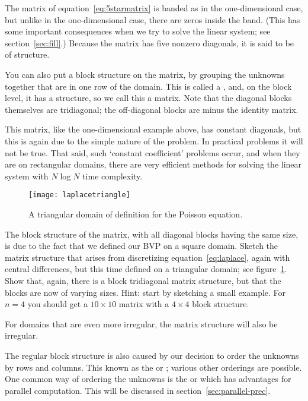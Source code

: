 The matrix of equation~\ref{eq:5starmatrix} is banded as in the
one-dimensional case, but
unlike in the one-dimensional case, there are zeros inside the
band. (This has some important consequences when we try to solve the
linear system; see section~\ref{sec:fill}.) Because the matrix has five
nonzero diagonals, it is said to be of 
structure.

You can also put a block structure on the matrix, by grouping the
unknowns together that are in one row of the domain. This is called a
, and, on the block level, it
has a
 structure,
so we call this a
 matrix. Note that the diagonal blocks
themselves are tridiagonal; the off-diagonal blocks are
minus the identity matrix.

This matrix, like the one-dimensional example above, has constant
diagonals, but this is again due to the simple nature of the
problem. In practical problems it will not be true. That said,
such `constant coefficient' problems occur, and when they are on
rectangular domains, there are very efficient methods for solving
the linear system with $N\log N$ time complexity.
\begin{figure}
  \texttt{[image: laplacetriangle]}
  \caption{A triangular domain of definition for the Poisson equation.}
  \label{fig:laplacetriangle}
\end{figure}

\begin{exercise}
  The block structure of the matrix, with all diagonal blocks having
  the same size, is due to the fact that we defined our \ac{BVP} on a
  square domain. Sketch the matrix structure that arises from
  discretizing equation~\eqref{eq:laplace}, again with central
  differences, but this time defined on a triangular domain; see
  figure~\ref{fig:laplacetriangle}. Show that, again, there is a block
  tridiagonal matrix structure, but that the blocks are now of varying
  sizes. Hint: start by sketching a small example. For $n=4$ you
  should get a $10\times 10$ matrix with a $4\times 4$ block structure.
\end{exercise}
For domains that are even more irregular, the matrix structure will
also be irregular.

The regular block structure is also caused by our decision to order
the unknowns by rows and columns. This known as the  or ; various other orderings are
possible. One common way of ordering the unknowns is the
 or  which has advantages for parallel computation. This will
be discussed in section~\ref{sec:parallel-prec}.

